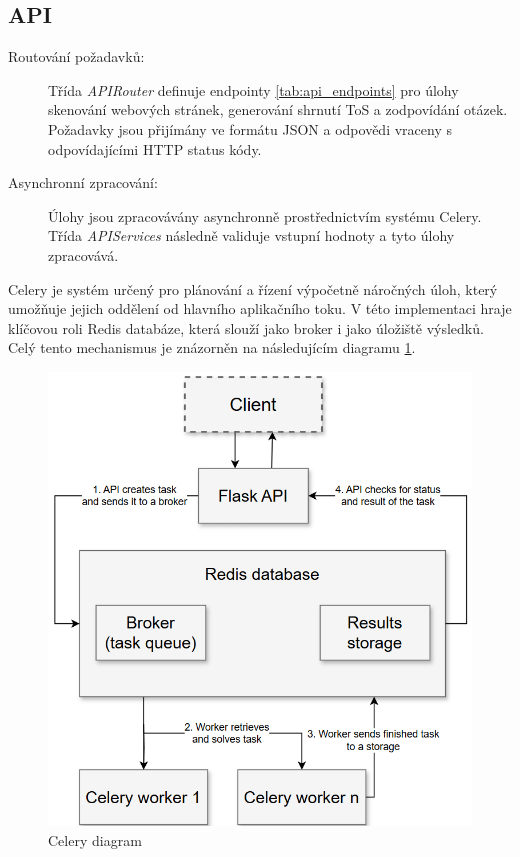\subsection{API}
\label{chap:api}

\begin{description}
    \item[Routování požadavků:] Třída \textit{APIRouter} definuje endpointy \ref{tab:api_endpoints} pro úlohy skenování webových stránek, generování shrnutí ToS a zodpovídání otázek. Požadavky jsou přijímány ve formátu JSON a odpovědi vraceny s odpovídajícími HTTP status kódy.
    \item[Asynchronní zpracování:] Úlohy jsou zpracovávány asynchronně prostřednictvím systému Celery. Třída \textit{APIServices} následně validuje vstupní hodnoty a tyto úlohy zpracovává.
  \end{description}
  

Celery je systém určený pro plánování a řízení výpočetně náročných úloh, který umožňuje jejich oddělení od hlavního aplikačního toku.
V této implementaci hraje klíčovou roli Redis databáze, která slouží jako broker i jako úložiště výsledků.
Celý tento mechanismus je znázorněn na následujícím diagramu \ref{fig:celery_diagram}.
\begin{figure}[H]
    \centering
    \includegraphics[width=\linewidth]{images/celery.png}
    \caption{Celery diagram}
    \label{fig:celery_diagram}
\end{figure}

